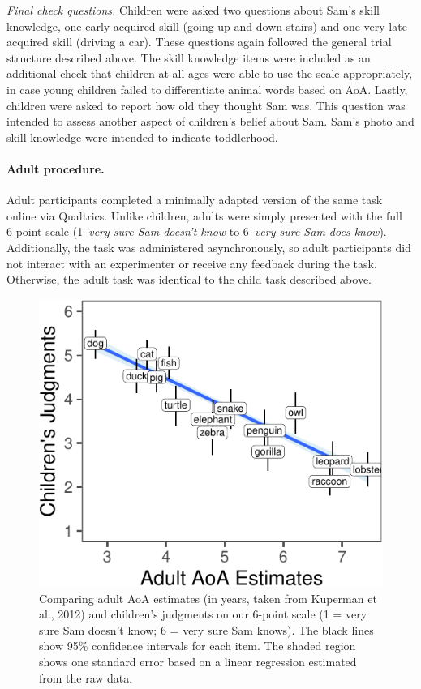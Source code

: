 \documentclass[10pt, letterpaper]{article}
\newenvironment{CodeChunk}{}{}
\begin{document}
\emph{Final check questions.} Children were asked two questions about
Sam's skill knowledge, one early acquired skill (going up and down
stairs) and one very late acquired skill (driving a car). These
questions again followed the general trial structure described above.
The skill knowledge items were included as an additional check that
children at all ages were able to use the scale appropriately, in case
young children failed to differentiate animal words based on AoA.
Lastly, children were asked to report how old they thought Sam was. This
question was intended to assess another aspect of children's belief
about Sam. Sam's photo and skill knowledge were intended to indicate
toddlerhood.

\hypertarget{adult-procedure.}{%
\paragraph{Adult procedure.}\label{adult-procedure.}}

Adult participants completed a minimally adapted version of the same
task online via Qualtrics. Unlike children, adults were simply presented
with the full 6-point scale (1--\emph{very sure Sam doesn't know} to
6--\emph{very sure Sam does know}). Additionally, the task was
administered asynchronously, so adult participants did not interact with
an experimenter or receive any feedback during the task. Otherwise, the
adult task was identical to the child task described above.

\begin{CodeChunk}
\begin{figure}[tb]
\includegraphics{figs/overall-1} \caption[Comparing adult AoA estimates (in years, taken from Kuperman et al., 2012) and children’s judgments on our 6-point scale (1 = very sure Sam doesn’t know]{Comparing adult AoA estimates (in years, taken from Kuperman et al., 2012) and children’s judgments on our 6-point scale (1 = very sure Sam doesn’t know; 6 = very sure Sam knows). The black lines show 95\% confidence intervals for each item. The shaded region shows one standard error based on a linear regression estimated from the raw data.}\label{fig:overall}
\end{figure}
\end{CodeChunk}
\end{document}

